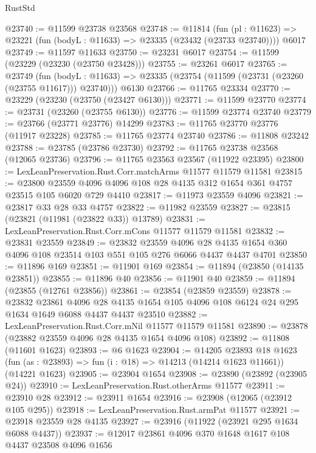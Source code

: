 \begin{lexlean}{RustStd}
\begin{coremodule}
@23740 := @11599 @23738 @23568
@23748 := @11814
    (fun (pl : @11623) => @23221 (fun (bodyL : @11633) => @23335 (@23432 (@23733 @23740))))
    @6017
@23749 := @11597 @11633
@23750 := @23231 @6017
@23754 := @11599 (@23229 (@23230 (@23750 @23428)))
@23755 := @23261 @6017
@23765 := @23749
    (fun (bodyL : @11633) => @23335 (@23754 (@11599 (@23731 (@23260 (@23755 @11617))) @23740)))
    @6130
@23766 := @11765 @23334
@23770 := @23229 (@23230 (@23750 (@23427 @6130)))
@23771 := @11599 @23770
@23774 := @23731 (@23260 (@23755 @6130))
@23776 := @11599 @23774 @23740
@23779 := @23766 (@23771 @23776) @14299
@23783 := @11765 @23770 @23776 (@11917 @23228)
@23785 := @11765 @23774 @23740
@23786 := @11808 @23242
@23788 := @23785 (@23786 @23730)
@23792 := @11765 @23738 @23568 (@12065 @23736)
@23796 := @11765 @23563 @23567 (@11922 @23395)
@23800 := LexLeanPreservation.Rust.Corr.matchArms @11577 @11579 @11581
@23815 := @23800
    @23559
    @4096
    @4096
    @108
    @28
    @4135
    @312
    @1654
    @361
    @4757
    @23515
    @105
    @6020
    @729
    @4410
@23817 := @11973 @23559 @4096
@23821 := @23817 @33 @28 @33 @4757
@23822 := @11982 @23559
@23827 := @23815 (@23821 (@11981 (@23822 @33)) @13789)
@23831 := LexLeanPreservation.Rust.Corr.mCons @11577 @11579 @11581
@23832 := @23831 @23559
@23849 := @23832
    @23559
    @4096
    @28
    @4135
    @1654
    @360
    @4096
    @108
    @23514
    @103
    @551
    @105
    @276
    @6066
    @4437
    @4437
    @4701
@23850 := @11896 @169
@23851 := @11901 @169
@23854 := @11894 (@23850 (@14135 @23851))
@23855 := @11896 @40
@23856 := @11901 @40
@23859 := @11894 (@23855 (@12761 @23856))
@23861 := @23854 (@23859 @23559)
@23878 := @23832
    @23861
    @4096
    @28
    @4135
    @1654
    @105
    @4096
    @108
    @6124
    @24
    @295
    @1634
    @1649
    @6088
    @4437
    @4437
    @23510
@23882 := LexLeanPreservation.Rust.Corr.mNil @11577 @11579 @11581
@23890 := @23878 (@23882 @23559 @4096 @28 @4135 @1654 @4096 @108)
@23892 := @11808 (@11601 @1623)
@23893 := @6 @1623
@23904 := @14205
    @23893
    @18
    @1623
    (fun (as : @23893) => fun (i : @18) => @14213 (@14214 @1623 @11661))
    (@14221 @1623)
@23905 := @23904 @1654
@23908 := @23890 (@23892 (@23905 @24))
@23910 := LexLeanPreservation.Rust.otherArms @11577
@23911 := @23910 @28
@23912 := @23911 @1654
@23916 := @23908 (@12065 (@23912 @105 @295))
@23918 := LexLeanPreservation.Rust.armPat @11577
@23921 := @23918 @23559 @28 @4135
@23927 := @23916 (@11922 (@23921 @295 @1634 @6088 @4437))
@23937 := @12017 @23861 @4096 @370 @1648 @1617 @108 @4437 @23508 @4096 @1656

\end{coremodule}
\end{lexlean}

